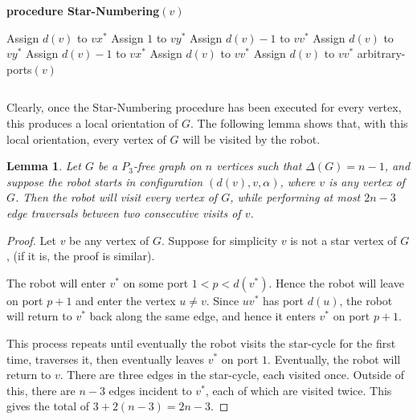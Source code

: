 \documentclass[12pt,letterpaper,oneside]{book}
\newtheorem{lemma}[theorem]{Lemma}
\begin{document}
\begin{center}\begin{tabular*}{\textwidth}{c}\hline\end{tabular*}\end{center}
\noindent \textbf{procedure Star-Numbering}$(v)$
\begin{algorithmic}[1] 
\STATE Assign $d(v)$ to $vx^*$
\STATE Assign $1$ to $vy^*$
\ENDIF
{}
\STATE Assign $d(v)-1$ to $vv^*$
\STATE Assign $d(v)$ to $vy^*$
\ENDIF
{}
\STATE Assign $d(v)-1$ to $vx^*$
\STATE Assign $d(v)$ to $vv^*$
\ENDIF
{}
\STATE Assign $d(v)$ to $vv^*$
\ENDIF
\STATE arbitrary-ports$(v)$
\end{algorithmic}
\begin{center}\begin{tabular*}{\textwidth}{c}\hline\end{tabular*}\end{center}


Clearly, once the Star-Numbering procedure has been executed for every vertex, this produces a local orientation of $G$.  The following 
lemma shows that, with this local orientation, every vertex of $G$ will be visited by the robot.   

\begin{lemma}\label{lemstar}
Let $G$ be a $P_3$-free graph on $n$ vertices such that $\Delta(G)=n-1$, and suppose the robot starts in configuration $(d(v),v,\alpha)$, 
where $v$ is any vertex of $G$.  Then the robot will visit every vertex of $G$, while performing at most $2n-3$ edge traversals between 
two consecutive visits of $v$.  
\end{lemma}
\begin{proof}

Let $v$ be any vertex of $G$.  Suppose for simplicity $v$ is not a star vertex of $G$, (if it is, the proof is similar).  

The robot will enter $v^*$ on some port $1<p<d(v^*)$.  Hence the robot will leave on port $p+1$ and enter the vertex $u\ne v$.  Since $uv^*$ has 
port $d(u)$, the robot will return to $v^*$ back along the same edge, and hence it enters $v^*$ on port $p+1$.  

This process repeats until eventually the robot visits the star-cycle for the first time, traverses it, then eventually leaves $v^*$ on 
port $1$.  Eventually, the robot will return to $v$.  There are three edges in the star-cycle, each visited once.  Outside of this, there 
are $n-3$ edges incident to $v^*$, each of which are visited twice.  This gives the total of $3+2(n-3)=2n-3$.  

\end{proof}
\end{document}
